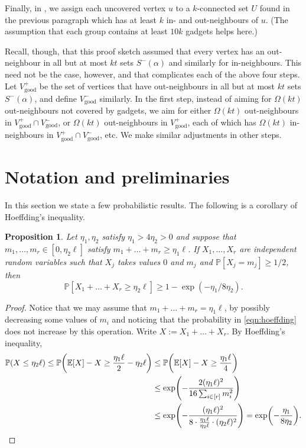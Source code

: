 \documentclass[english]{article}
\theoremstyle{plain}
\newtheorem{proposition}[theorem]{Proposition}
\theoremstyle{remark}
\def\Ex{\mathbb{E}}
\def \Sm {S^-}
\def \Vgp {V_{\good}^+}
\def \Vgp {V_{\good}^+}
\def \Vgm {V_{\good}^-}
\def \Vgm {V_{\good}^-}
\renewcommand{\Pr}{\mathbb{P}}
\let\originalleft\left
\let\originalright\right
\renewcommand{\left}{\mathopen{}\mathclose\bgroup\originalleft}
\renewcommand{\right}{\aftergroup\egroup\originalright}
\DeclareMathOperator{\good}{good}
\begin{document}
	Finally, in , we assign each uncovered vertex $u$ to a $k$-connected set $U$ found in the previous paragraph which has at least $k$ in- and out-neighbours of $u$. 
	(The assumption that each group contains at least $10k$ gadgets helps here.)

	Recall, though, that this proof sketch assumed that every vertex has an out-neighbour in all but at most $kt$ sets $\Sm(\alpha)$ and similarly for in-neighbours. This need not be the case, however, and that complicates each of the above four steps. Let $\Vgp$ be the set of vertices that have out-neighbours in all but at most $kt$ sets $\Sm(\alpha)$, and define $\Vgm$ similarly. In the first step, instead of aiming for $\Omega(kt)$ out-neighbours not covered by gadgets, we aim for either $\Omega(kt)$ out-neighbours in $\Vgp \cap \Vgm$, or $\Omega(kt)$ out-neighbours in $\Vgp$, each of which has $\Omega(kt)$ in-neighbours in $\Vgp \cap \Vgm$, etc. We make similar adjustments in other steps.
	

\section{Notation and preliminaries} \label{sec:prelims}
	In this section we state a few probabilistic results. The following is a corollary of Hoeffding's inequality. 

	\begin{proposition} \label{prop:hoeffding}
		Let $\eta_1, \eta_2$ satisfy $\eta_1 > 4\eta_2 > 0$ and suppose that $m_1, \ldots, m_r \in [0, \eta_2 \ell]$ satisfy $m_1 + \ldots + m_r \ge \eta_1 \ell$. If $X_1, \ldots, X_r$ are independent random variables such that $X_j$ takes values $0$ and $m_j$ and $\Pr[X_j = m_j] \ge 1/2$, then
		\begin{equation} \label{eqn:hoeffding}
			\Pr[X_1 + \ldots + X_r \ge \eta_2 \ell] \ge 1 - \exp(-\eta_1/8\eta_2).
		\end{equation}
	\end{proposition}

	\begin{proof}
		Notice that we may assume that $m_1 + \ldots + m_r = \eta_1 \ell$, by possibly decreasing some values of $m_i$ and noticing that the probability in \eqref{eqn:hoeffding} does not increase by this operation.
		Write $X := X_1 + \ldots + X_r$.
		By Hoeffding's inequality,
		\begin{align*}
			\Pr\left( X \le \eta_2 \ell \right) 
			\le \Pr\left(\Ex[X] - X \ge \frac{\eta_1 \ell}{2} - \eta_2 \ell \right) 
			& \le \Pr\left(\Ex[X] - X \ge \frac{\eta_1 \ell}{4} \right) \\
			& \le \exp\left( -\frac{2(\eta_1 \ell)^2}{16\sum_{i \in [r]} m_i^2}\right) \\
			& \le \exp \left( -\frac{(\eta_1\ell)^2}{8 \cdot \frac{\eta_1 \ell}{\eta_2 \ell} \cdot (\eta_2 \ell)^2} \right)
			= \exp\left(-\frac{\eta_1}{8\eta_2}\right). \qedhere
		\end{align*}
	\end{proof}
\end{document}
